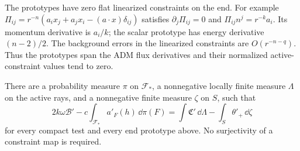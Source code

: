 The prototypes have zero flat linearized constraints on the end.
For example
$\Pi_{ij}=r^{-n}(a_ix_j+a_jx_i-(a\cdot x)\delta_{ij})$
satisfies $\partial_j\Pi_{ij}=0$ and
$\Pi_{ij}n^j=r^{-k}a_i$.  Its momentum derivative is $a_i/k$;
the scalar prototype has energy derivative $(n-2)/2$.
The background errors in the linearized constraints are
$O(r^{-n-q})$.  Thus the prototypes span the ADM flux derivatives
and their normalized active-constraint values tend to zero.

\begin{proposition}
\label{var:multiplier-identity}
There are a probability measure $\pi$ on $\mathcal F_*$, a
nonnegative locally finite measure $\Lambda$ on the active rays,
and a nonnegative finite measure $\zeta$ on $S$, such that
\begin{equation}
 2k\omega\mathcal B'-c\int_{\mathcal F_*}a'_F(h)\,\dd\pi(F)
 =\int\mathfrak C'\,\dd\Lambda-\int_S\theta'_+\,\dd\zeta
 \label{var:separation}
\end{equation}
for every compact test and every end prototype above.  No
surjectivity of a constraint map is required.
\end{proposition}

